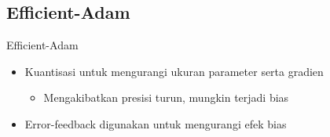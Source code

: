 \subsection{Efficient-Adam}
\begin{frame}{Efficient-Adam \parencite{Chen2022Efficient}}
  \begin{itemize}
    \item Kuantisasi untuk mengurangi ukuran parameter serta gradien
          \begin{itemize}
            \item Mengakibatkan presisi turun, mungkin terjadi bias
          \end{itemize}
    \item Error-feedback digunakan untuk mengurangi efek bias
  \end{itemize}
\end{frame}
